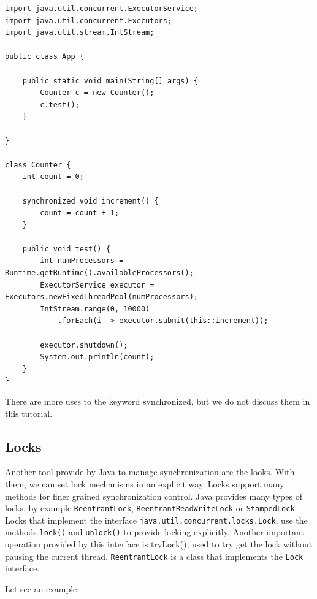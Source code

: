 \documentclass[openany, a4paper]{book}
\theoremstyle{break}
\theoremstyle{example}
\theoremstyle{note}
\theoremstyle{break}
\theoremstyle{exercise}
\begin{document}
\begin{verbatim}
import java.util.concurrent.ExecutorService;
import java.util.concurrent.Executors;
import java.util.stream.IntStream;

public class App {

    public static void main(String[] args) {
        Counter c = new Counter();
        c.test();
    }

}

class Counter {
    int count = 0;

    synchronized void increment() {
        count = count + 1;
    }

    public void test() {
        int numProcessors = Runtime.getRuntime().availableProcessors();
        ExecutorService executor = Executors.newFixedThreadPool(numProcessors);
        IntStream.range(0, 10000)
            .forEach(i -> executor.submit(this::increment));

        executor.shutdown();
        System.out.println(count);
    }
}
\end{verbatim}

There are more uses to the keyword synchronized, but we do not discuss them
in this tutorial.


\subsection{Locks}
\label{sec:org509ca4e}


Another tool provide by Java to manage synchronization are the looks. With
them, we can set lock mechanisms in an explicit way. Locks support many
methods for finer grained synchronization control. Java provides many types
of locks, by  example \texttt{ReentrantLock}, \texttt{ReentrantReadWriteLock} or
\texttt{StampedLock}. Locks that implement the interface
\texttt{java.util.concurrent.locks.Lock}, use the methods \texttt{lock()} and \texttt{unlock()} to
provide locking explicitly. Another important operation provided by this
interface is tryLock(), used to try get the lock without pausing the current
thread. \texttt{ReentrantLock} is a class that implements the \texttt{Lock} interface.

Let see an example:
\end{document}

